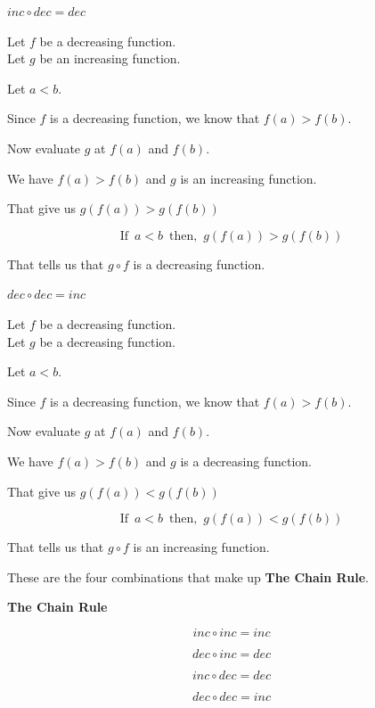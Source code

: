 \documentclass{ximera}
\begin{document}
\begin{fact}  \textbf{\textcolor{red!75!green}{$inc \circ dec = dec$}} 

Let $f$ be a decreasing function. \\
Let $g$ be an increasing function.


Let $a < b$.

Since $f$ is a decreasing function, we know that $f(a) > f(b)$.

Now evaluate $g$ at $f(a)$ and $f(b)$.


We have $f(a) > f(b)$ and $g$ is an increasing function. 

That give us $g(f(a)) > g(f(b))$



\[ \text{If } \, a < b \, \text{ then, } \, g(f(a)) > g(f(b)) \]

That tells us that $g \circ f$ is a decreasing function.

\end{fact}
















\begin{fact}  \textbf{\textcolor{red!75!green}{$dec \circ dec = inc$}} 

Let $f$ be a decreasing function. \\
Let $g$ be a decreasing function.


Let $a < b$.

Since $f$ is a decreasing function, we know that $f(a) > f(b)$.

Now evaluate $g$ at $f(a)$ and $f(b)$.


We have $f(a) > f(b)$ and $g$ is a decreasing function. 

That give us $g(f(a)) < g(f(b))$



\[ \text{If } \, a < b \, \text{ then, } \, g(f(a)) < g(f(b)) \]

That tells us that $g \circ f$ is an increasing function.

\end{fact}


These are the four combinations that make up \textbf{\textcolor{-red!75!green}{The Chain Rule}}.


\begin{theorem} \textbf{\textcolor{-red!75!green}{The Chain Rule}} 

\[ inc \circ inc = inc \]

\[ dec \circ inc = dec \]

\[ inc \circ dec = dec \]

\[ dec \circ dec = inc \]

\end{theorem}
\end{document}
